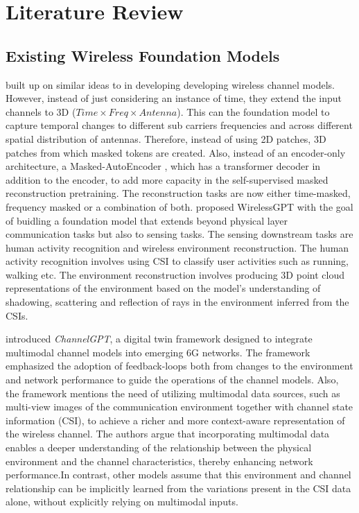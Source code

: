 \section{Literature Review}
\subsection{Existing Wireless Foundation Models}

\cite{liu2025wifo} built up on similar ideas  to \cite{alikhani2024large} in developing developing wireless channel models. However, instead of just considering an instance of time, they extend the input channels to 3D ($Time \times Freq \times Antenna$). This can the foundation model to capture temporal changes to different sub carriers frequencies and across different spatial distribution of antennas. Therefore, instead of using 2D patches, 3D patches from which masked tokens are created. Also, instead of an encoder-only architecture, a Masked-AutoEncoder \cite{he2022masked}, which has a transformer decoder in addition to the encoder, to add more capacity in the self-supervised masked reconstruction pretraining. The reconstruction tasks are now either time-masked, frequency masked or a combination of both.
\cite{yang2025wirelessgpt} proposed WirelessGPT with the goal of buidling a foundation model that extends beyond physical layer communication tasks but also to sensing tasks. The sensing downstream tasks are human activity recognition and wireless environment reconstruction. The human activity recognition involves using CSI to classify user activities such as running, walking etc. The environment reconstruction involves producing 3D point cloud representations of the environment based on the model's understanding of shadowing, scattering and reflection of rays in the environment inferred from the CSIs. 

\cite{yu2024channelgpt} introduced \textit{ChannelGPT}, a digital twin framework designed to integrate multimodal channel models into emerging 6G networks. The framework emphasized the adoption of feedback-loops both from changes to the environment and network performance to guide the operations of the channel models. Also,     the framework mentions the need of utilizing multimodal data sources, such as multi-view images of the communication environment together with channel state information (CSI), to achieve a richer and more context-aware representation of the wireless channel. The authors argue that incorporating multimodal data enables a deeper understanding of the relationship between the physical environment and the channel characteristics, thereby enhancing network performance.In contrast, other models assume that this environment and channel relationship can be implicitly learned from the variations present in the CSI data alone, without explicitly relying on multimodal inputs.